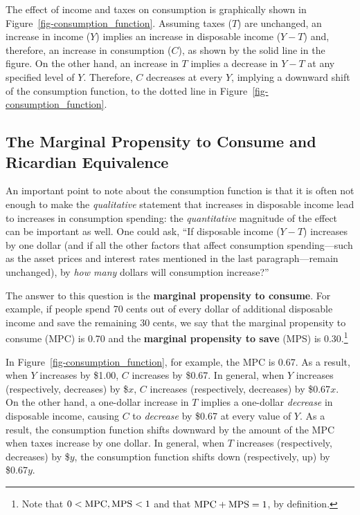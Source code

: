 \documentclass[
  letterpaper,
]{book}
\theoremstyle{plain}
\theoremstyle{remark}
\begin{document}
The effect of income and taxes on consumption is graphically shown in
Figure~\ref{fig-consumption_function}. Assuming taxes (\(T\)) are
unchanged, an increase in income (\(Y\)) implies an increase in
disposable income (\(Y-T\)) and, therefore, an increase in consumption
(\(C\)), as shown by the solid line in the figure. On the other hand, an
increase in \(T\) implies a decrease in \(Y-T\) at any specified level
of \(Y\). Therefore, \(C\) decreases at every \(Y\), implying a downward
shift of the consumption function, to the dotted line in
Figure~\ref{fig-consumption_function}.

\subsection{The Marginal Propensity to Consume and Ricardian
Equivalence}\label{sec-mpc}

An important point to note about the consumption function is that it is
often not enough to make the \emph{qualitative} statement that increases
in disposable income lead to increases in consumption spending: the
\emph{quantitative} magnitude of the effect can be important as well.
One could ask, ``If disposable income (\(Y-T\)) increases by one dollar
(and if all the other factors that affect consumption spending---such as
the asset prices and interest rates mentioned in the last
paragraph---remain unchanged), by \emph{how many} dollars will
consumption increase?''

The answer to this question is the \textbf{marginal propensity to
consume}.  For example, if people
spend 70 cents out of every dollar of additional disposable income and
save the remaining 30 cents, we say that the marginal propensity to
consume (MPC) is 0.70 and the \textbf{marginal propensity to save} (MPS)
is 0.30.\footnote{Note that \(0<\hbox{MPC},\hbox{MPS}<1\) and that
  \(\hbox{MPC}+\hbox{MPS}=1\), by definition.}

In Figure~\ref{fig-consumption_function}, for example, the MPC is 0.67.
As a result, when \(Y\) increases by \$1.00, \(C\) increases by \$0.67.
In general, when \(Y\) increases (respectively, decreases) by \$\(x\),
\(C\) increases (respectively, decreases) by \$0.67\(x\). On the other
hand, a one-dollar increase in \(T\) implies a one-dollar
\emph{decrease} in disposable income, causing \(C\) to \emph{decrease}
by \$0.67 at every value of \(Y\). As a result, the consumption function
shifts downward by the amount of the MPC when taxes increase by one
dollar. In general, when \(T\) increases (respectively, decreases) by
\$\(y\), the consumption function shifts down (respectively, up) by
\$0.67\(y\).
\end{document}
